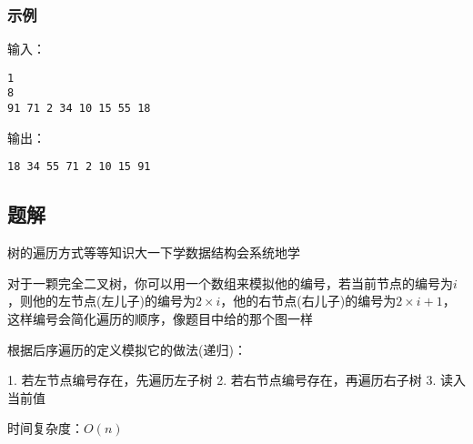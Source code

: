 \subsubsection{示例}
输入：
\begin{lstlisting}
1
8  
91 71 2 34 10 15 55 18
\end{lstlisting}

输出：
\begin{lstlisting}
18 34 55 71 2 10 15 91
\end{lstlisting}

\subsection{题解}

树的遍历方式等等知识大一下学数据结构会系统地学

对于一颗完全二叉树，你可以用一个数组来模拟他的编号，若当前节点的编号为$i$，则他的左节点(左儿子)的编号为$2 \times i$，他的右节点(右儿子)的编号为$2 \times i + 1$，这样编号会简化遍历的顺序，像题目中给的那个图一样

根据后序遍历的定义模拟它的做法(递归)：

1. 若左节点编号存在，先遍历左子树
2. 若右节点编号存在，再遍历右子树
3. 读入当前值

时间复杂度：$O(n)$

